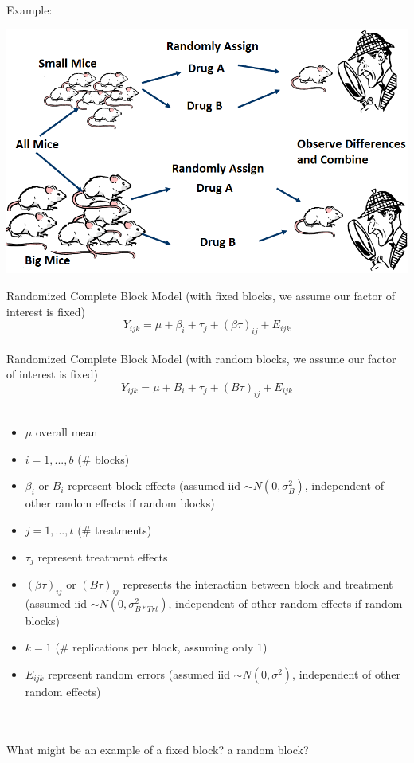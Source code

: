 Example:		
\begin{center}
\includegraphics[scale=0.43]{mice.png}
\end{center}

Randomized Complete Block Model (with fixed blocks, we assume our factor of interest is fixed)	
	$$Y_{ijk}=\mu+\beta_{i}+\tau_{j}+(\beta\tau)_{ij}+E_{ijk}$$~\\
Randomized Complete Block Model (with random blocks, we assume our factor of interest is fixed)			   
	$$Y_{ijk}=\mu+B_{i}+\tau_{j}+(B\tau)_{ij}+E_{ijk}$$~\\
    \begin{itemize}
    		\item{$\mu$ overall mean}
        \item{$i=1,...,b$ ($\#$ blocks)}
        \item{$\beta_{i}$ or $B_{i}$ represent block effects (assumed iid $\sim N(0,\sigma^2_{B})$, independent of other random effects if random blocks)}
        \item{$j=1,...,t$ ($\#$ treatments)}
        \item{$\tau_{j}$ represent treatment effects}
        \item{$(\beta\tau)_{ij}$ or $(B\tau)_{ij}$ represents the interaction between block and treatment (assumed iid $\sim N(0,\sigma^2_{B*Trt})$, independent of other random effects if random blocks)}
        \item{$k=1$ ($\#$ replications per block, assuming only 1)}
        \item{$E_{ijk}$ represent random errors (assumed iid $\sim N(0,\sigma^2)$, independent of other random effects)}
    \end{itemize}
~\\~\\
What might be an example of a fixed block?  a random block?\\~\\~\\~\\

